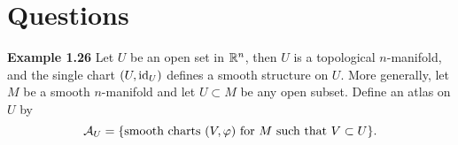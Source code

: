 \section{Questions}
\textbf{Example 1.26}
 Let $U$ be an open set in $\mathbb{R}^n$, then $U$ is a topological $n$-manifold, and the single chart $(U,\mathrm{id}_U)$ defines a smooth structure on $U$. 
    More generally, let $M$ be a smooth $n$-manifold and let $U \subset M$ be any open subset. Define an atlas on $U$ by 
    $$\mathcal{A}_U = \{\text{smooth charts }(V,\varphi)\text{ for }M\text{ such that }V \subset U\}.$$